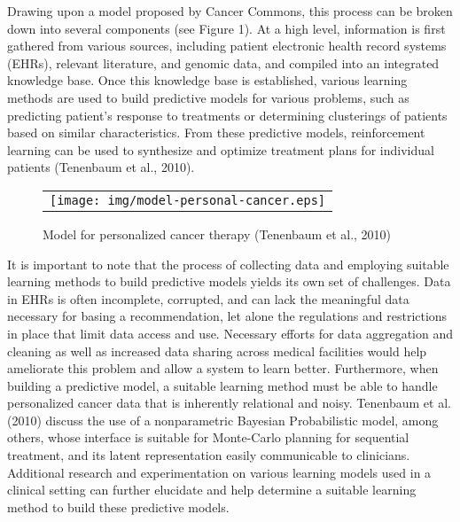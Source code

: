\documentclass[]{spie}  %
\begin{document}
Drawing upon a model proposed by Cancer Commons, this process can be broken down into several components (see Figure 1). At a high level, information is first gathered from various sources, including patient electronic health record systems (EHRs), relevant literature, and genomic data, and compiled into an integrated knowledge base. Once this knowledge base is established, various learning methods are used to build predictive models for various problems, such as predicting patient’s response to treatments or determining clusterings of patients based on similar characteristics. From these predictive models, reinforcement learning can be used to synthesize and optimize treatment plans for individual patients (Tenenbaum et al., 2010).


   \begin{figure}
   \begin{center}
   \begin{tabular}{c}
   \texttt{[image: img/model-personal-cancer.eps]}
   \end{tabular}
   \end{center}
   \caption[example]
   { \label{fig:example}
Model for personalized cancer therapy (Tenenbaum et al., 2010)}
   \end{figure}


It is important to note that the process of collecting data and employing suitable learning methods to build predictive models yields its own set of challenges. Data in EHRs is often incomplete, corrupted, and can lack the meaningful data necessary for basing a recommendation, let alone the regulations and restrictions in place that limit data access and use. Necessary efforts for data aggregation and cleaning as well as increased data sharing across medical facilities would help ameliorate this problem and allow a system to learn better. Furthermore, when building a predictive model, a suitable learning method must be able to handle personalized cancer data that is inherently relational and noisy. Tenenbaum et al. (2010) discuss the use of a nonparametric Bayesian Probabilistic model, among others, whose interface is suitable for Monte-Carlo planning for sequential treatment, and its latent representation easily communicable to clinicians. Additional research and experimentation on various learning models used in a clinical setting can further elucidate and help determine a suitable learning method to build these predictive models.
\end{document}
